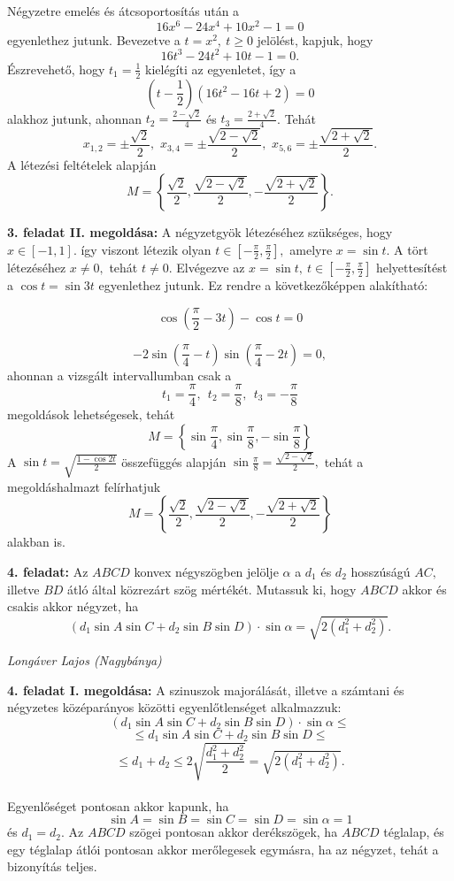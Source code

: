 \documentclass[a4paper,10pt]{article}
\def\ki#1#2{\hfill {\it #1 (#2)}\medskip}
\begin{document}
Négyzetre emelés és átcsoportosítás után a $$16x^6-24x^4+10x^2-1=0$$
egyenlethez jutunk. Bevezetve a $t=x^2,\ t\geq0$ jelölést, kapjuk,
hogy $$16t^3-24t^2+10t-1=0.$$ Észrevehető, hogy $t_1=\frac{1}{2}$
kielégíti az egyenletet, így a
$$\left(t-\frac{1}{2}\right)(16t^2-16t+2)=0$$ alakhoz jutunk, ahonnan
$t_2=\frac{2-\sqrt{2}}{4}$ és $t_3=\frac{2+\sqrt{2}}{4}$. Tehát
$$x_{1,2}=\pm\frac{\sqrt{2}}{2},\,\,
x_{3,4}=\pm\frac{\sqrt{2-\sqrt{2}}}{2},\,\,
x_{5,6}=\pm\frac{\sqrt{2+\sqrt{2}}}{2}.$$ A létezési
feltételek alapján
$$M=\left\{\frac{\sqrt{2}}{2},\frac{\sqrt{2-\sqrt{2}}}{2},-\frac{\sqrt{2+\sqrt{2}}}{2}\right\}.$$

\medskip

\textbf{3. feladat II. megoldása: } A négyzetgy\" ok létezéséhez szükséges, hogy \linebreak $x\in [-1,1].$ így viszont
létezik olyan $t\in \left [-\frac{\pi}{2},\frac{\pi}{2}\right ],$
amelyre $x=\sin t.$ A tört létezéséhez $x\neq 0,$ tehát
$t\neq 0.$ Elvégezve az $x=\sin{t}, \ t\in\left
[-\frac{\pi}{2},\frac{\pi}{2}\right ]$ helyettesítést a
$\cos{t}=\sin{3t}$ egyenlethez jutunk. Ez rendre a következ\H
oképpen alakítható:

$$\cos{\left(\frac{\pi}{2}-3t\right)}-\cos{t}=0$$

$$-2\sin\left(\frac{\pi}{4}-t\right)\sin\left(\frac{\pi}{4}-2t\right)=0,$$
ahonnan a vizsgált intervallumban csak a
$$t_1=\frac{\pi}{4},\ \  t_2=\frac{\pi}{8},\ \  t_3=-\frac{\pi}{8}$$
megoldások lehetségesek, tehát
$$M=\left  \{\sin \frac{\pi}{4},\sin \frac{\pi}{8},-\sin \frac{\pi}{8}\right \}$$
A $\sin t=\sqrt{\frac{1-\cos 2t}{2}}$ összefüggés alapján
$\sin \frac{\pi}{8}=\frac{\sqrt{2-\sqrt{2}}}{2},$ tehát a
megoldáshalmazt felírhatjuk
$$M=\left\{\frac{\sqrt{2}}{2},\frac{\sqrt{2-\sqrt{2}}}{2},-\frac{\sqrt{2+\sqrt{2}}}{2}\right\}$$
alakban is.

\medskip


{\bf 4. feladat: } Az $ABCD$ konvex négyszögben jelölje $\alpha$ a $d_1$ és $d_2$
hosszúságú $AC,$ illetve $BD$ átló által közrezárt szög
mértékét. Mutassuk ki, hogy $ABCD$ akkor és csakis akkor
négyzet, ha
$$(d_1\sin{A}\sin{C}+d_2\sin{B}\sin{D})\cdot\sin{\alpha}=
\sqrt{2(d_1^2+d_2^2)}.$$

\ki{Longáver Lajos}{Nagybánya}\medskip

\textbf{4. feladat I. megoldása: } A szinuszok majorálását, illetve a számtani és négy\-zetes középarányos közötti egyenlőtlenséget alkalmazzuk:
$$(d_1\sin{A}\sin{C}+d_2\sin{B}\sin{D})\cdot\sin{\alpha}\leq $$ $$\leq d_1\sin{A}\sin{C}+d_2\sin{B}\sin{D}\leq$$
$$\leq d_1+d_2\leq2\sqrt{\frac{d_1^2+d_2^2}{2}}=\sqrt{2(d_1^2+d_2^2)}.$$\\
Egyenlőséget pontosan akkor kapunk, ha
$$\sin{A}=\sin{B}=\sin{C}=\sin{D}=\sin{\alpha}=1$$ és $d_1=d_2$. Az
$ABCD$ szögei pontosan akkor derékszögek, ha $ABCD$ téglalap, és
egy téglalap átlói pontosan akkor merőlegesek egy\-másra, ha az
négyzet, tehát a bizonyítás teljes.
\end{document}
